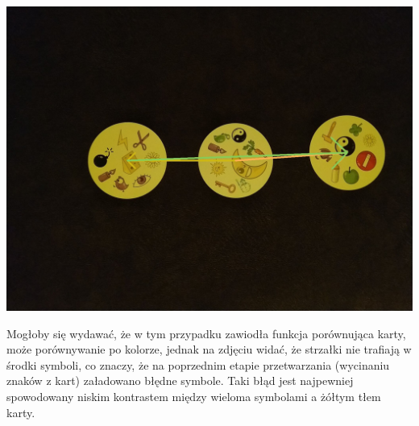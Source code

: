\documentclass[10pt,a4paper]{article}
\begin{document}
\begin{center}
\includegraphics[scale=0.28]{hard/img_arrows6.jpg}
\end{center}
Mogłoby się wydawać, że w tym przypadku zawiodła funkcja porównująca karty, może porównywanie po kolorze, jednak na zdjęciu widać, że strzałki nie trafiają w środki symboli, co znaczy, że na poprzednim etapie przetwarzania (wycinaniu znaków z kart) załadowano błędne symbole. Taki błąd jest najpewniej spowodowany niskim kontrastem między wieloma symbolami a żółtym tłem karty.
\end{document}
